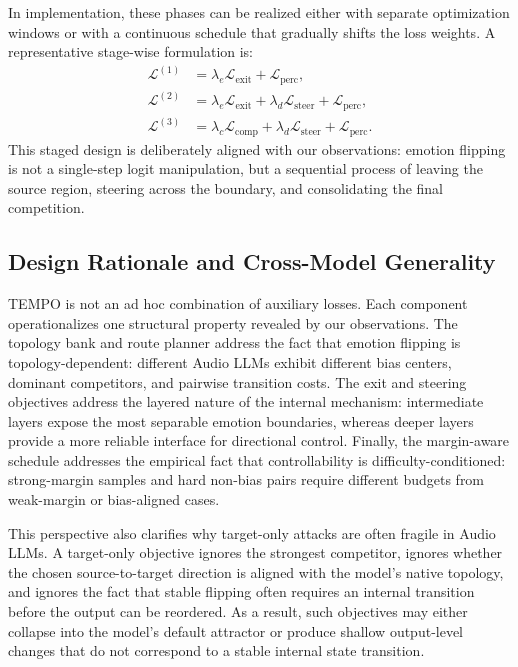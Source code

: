 In implementation, these phases can be realized either with separate optimization windows or with a continuous schedule that gradually shifts the loss weights. A representative stage-wise formulation is:
\begin{align}
\mathcal{L}^{(1)} &= \lambda_e \mathcal{L}_{\mathrm{exit}} + \mathcal{L}_{\mathrm{perc}}, \\
\mathcal{L}^{(2)} &= \lambda_e \mathcal{L}_{\mathrm{exit}} + \lambda_d \mathcal{L}_{\mathrm{steer}} + \mathcal{L}_{\mathrm{perc}}, \\
\mathcal{L}^{(3)} &= \lambda_c \mathcal{L}_{\mathrm{comp}} + \lambda_d \mathcal{L}_{\mathrm{steer}} + \mathcal{L}_{\mathrm{perc}}.
\end{align}
This staged design is deliberately aligned with our observations: emotion flipping is not a single-step logit manipulation, but a sequential process of leaving the source region, steering across the boundary, and consolidating the final competition.

\subsection{Design Rationale and Cross-Model Generality}
\label{subsec:tempo-discussion}

\textsc{TEMPO} is not an ad hoc combination of auxiliary losses. Each component operationalizes one structural property revealed by our observations. The topology bank and route planner address the fact that emotion flipping is topology-dependent: different Audio LLMs exhibit different bias centers, dominant competitors, and pairwise transition costs. The exit and steering objectives address the layered nature of the internal mechanism: intermediate layers expose the most separable emotion boundaries, whereas deeper layers provide a more reliable interface for directional control. Finally, the margin-aware schedule addresses the empirical fact that controllability is difficulty-conditioned: strong-margin samples and hard non-bias pairs require different budgets from weak-margin or bias-aligned cases.

This perspective also clarifies why target-only attacks are often fragile in Audio LLMs. A target-only objective ignores the strongest competitor, ignores whether the chosen source-to-target direction is aligned with the model's native topology, and ignores the fact that stable flipping often requires an internal transition before the output can be reordered. As a result, such objectives may either collapse into the model's default attractor or produce shallow output-level changes that do not correspond to a stable internal state transition.

